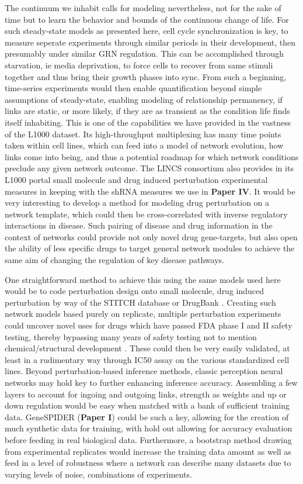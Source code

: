 The continuum we inhabit calls for modeling nevertheless, not for the sake of time but to learn the behavior and bounds of the continuous change of life. For such steady-state models as presented here, cell cycle synchronization is key, to measure seperate experiments through similar periods in their development, then presumably under similar GRN regulation. This can be accomplished through starvation, ie media deprivation, to force cells to recover from same stimuli together and thus bring their growth phases into sync. From such a beginning, time-series experiments would then enable quantification beyond simple assumptions of steady-state, enabling modeling of relationship permanency, \ie if links are static, or more likely, if they are as transient as the condition life finds itself inhabiting. This is one of the capabilities we have provided in the vastness of the L1000 dataset. Its high-throughput multiplexing has many time points taken within cell lines, which can feed into a model of network evolution, how links come into being, and thus a potential roadmap for which network conditions preclude any given network outcome.
The LINCS consortium also provides in its L1000 portal small molecule and drug induced perturbation experimental measures in keeping with the shRNA measures we use in \textbf{Paper IV}. It would be very interesting to develop a method for modeling drug perturbation on a network template, which could then be cross-correlated with inverse regulatory interactions in disease. Such pairing of disease and drug information in the context of networks could provide not only novel drug gene-targets, but also open the ability of less specific drugs to target general network modules to achieve the same aim of changing the regulation of key disease pathways.

One straightforward method to achieve this using the same models used here would be to code perturbation design onto small molecule, drug induced perturbation by way of the STITCH database \citep{kuhn2009stitch} or DrugBank \citep{wishart2006drugbank}. Creating such network models based purely on replicate, multiple perturbation experiments could uncover novel uses for drugs which have passed FDA phase I and II safety testing, thereby bypassing many years of safety testing not to mention chemical/structural development \citep{oprea2011drug}. These could then be very easily validated, at least in a rudimentary way through IC50 assay on the various standardized cell lines.
Beyond perturbation-based inference methods, classic perception neural networks may hold key to further enhancing inference accuracy. Assembling a few layers to account for ingoing and outgoing links, strength as weights and up or down regulation would be easy when matched with a bank of sufficient training data. GeneSPIDER (\textbf{Paper I}) could be such a key, allowing for the creation of much synthetic data for training, with hold out allowing for accuracy evaluation before feeding in real biological data. Furthermore, a bootstrap method drawing from experimental replicates would increase the training data amount as well as feed in a level of robustness where a network can describe many datasets due to varying levels of noise, combinations of experiments.

